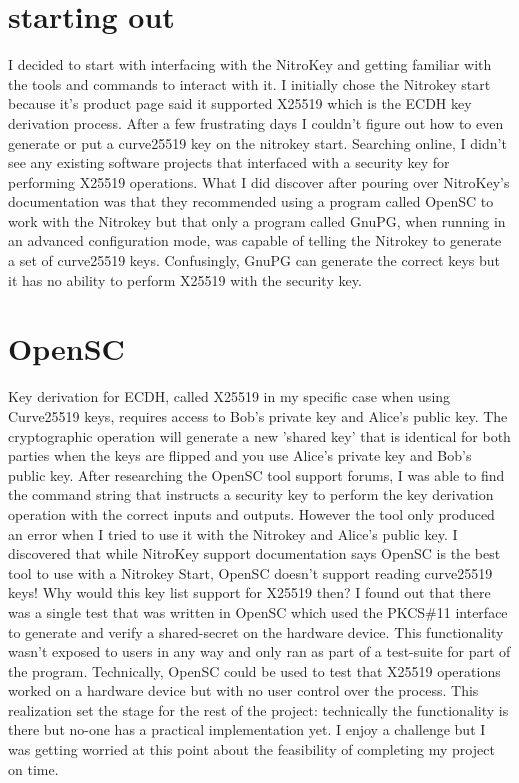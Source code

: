 \documentclass [11pt, proquest] {uwthesis}[2020/02/24]
\begin{document}
\section{starting out}

I decided to start with interfacing with the NitroKey and getting familiar with the tools and commands to interact with it. I initially chose the Nitrokey start because it's product page said it supported X25519\cite{noauthor_nitrokey_nodate} which is the ECDH key derivation process. After a few frustrating days I couldn't figure out how to even generate or put a curve25519 key on the nitrokey start. Searching online, I didn't see any existing software projects that interfaced with a security key for performing X25519 operations. What I did discover after pouring over NitroKey's documentation was that they recommended using a program called OpenSC to work with the Nitrokey but that only a program called GnuPG, when running in an advanced configuration mode, was capable of telling the Nitrokey to generate a set of curve25519 keys. Confusingly, GnuPG can generate the correct keys but it has no ability to perform X25519 with the security key.

\section {OpenSC}
Key derivation for ECDH, called X25519 in my specific case when using Curve25519 keys, requires access to Bob's private key and Alice's public key. The cryptographic operation will generate a new 'shared key' that is identical for both parties when the keys are flipped and you use Alice's private key and Bob's public key. 
After researching the OpenSC tool support forums, I was able to find the command string that instructs a  security key to perform the key derivation operation with the correct inputs and outputs. However the tool only produced an error when I tried to use it with the Nitrokey and Alice's public key. I discovered that while NitroKey support documentation says OpenSC is the best tool to use with a Nitrokey Start, OpenSC doesn't support reading curve25519 keys! Why would this key list support for X25519 then? I found out that there was a single test that was written in OpenSC which used the PKCS\#11 interface to generate and verify a shared-secret on the hardware device. This functionality wasn't exposed to users in any way and only ran as part of a test-suite for part of the program. Technically, OpenSC could be used to test that X25519 operations worked on a hardware device but with no user control over the process. This realization set the stage for the rest of the project: technically the functionality is there but no-one has a practical implementation yet. I enjoy a challenge but I was getting worried at this point about the feasibility of completing my project on time.
\end{document}
